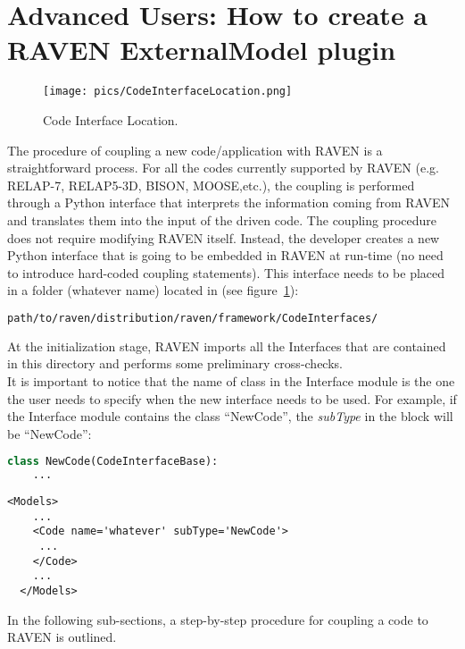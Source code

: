 \section{Advanced Users: How to create a RAVEN ExternalModel plugin}
\label{sec:newExternalModelPlugin}
\begin{figure}
\centering
\texttt{[image: pics/CodeInterfaceLocation.png]}
\caption{Code Interface Location.}
\label{fig:codeinterface}
\end{figure}
The procedure of coupling a new code/application with RAVEN is a straightforward process.
For all the codes currently supported by RAVEN (e.g. RELAP-7, RELAP5-3D,
BISON, MOOSE,etc.), the coupling is performed through a Python interface that interprets the information coming from RAVEN and translates them into the
  input of the driven code.
The coupling procedure does not require modifying RAVEN itself. Instead, the developer creates a new Python interface that is going to be embedded
 in RAVEN at run-time (no need to introduce  hard-coded coupling statements).
 This interface needs to be placed in a folder (whatever name) located in (see figure~\ref{fig:codeinterface}):
\begin{lstlisting}[language=bash]
 path/to/raven/distribution/raven/framework/CodeInterfaces/
\end{lstlisting}
At the initialization stage, RAVEN imports all the Interfaces that are contained in this directory and performs some preliminary cross-checks.
\\It is important to notice that the name of class in the Interface module is the one the user needs to specify when the new interface 
needs to be used. For example, if the Interface module contains the class 	``NewCode'', the \textit{subType} in the  block will be 	``NewCode'':
\begin{lstlisting}[language=python]
  class NewCode(CodeInterfaceBase):
    ...
\end{lstlisting}
\begin{lstlisting}[style=XML,morekeywords={name,file}] %moreemph={name,file}]
  <Models>
    ...
    <Code name='whatever' subType='NewCode'>
     ...
    </Code>
    ...
  </Models>
\end{lstlisting}
In the following sub-sections, a step-by-step procedure for coupling a code to RAVEN is outlined.
